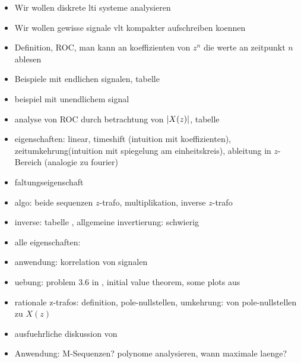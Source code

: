\begin{itemize}
    \item Wir wollen diskrete \gls{lti} systeme analysieren
    \item Wir wollen gewisse signale vlt kompakter aufschreiben koennen
    \item Definition, ROC, man kann an koeffizienten von $z^n$ die werte an zeitpunkt $n$ ablesen
    \item Beispiele mit endlichen signalen, tabelle \cite[p155, top]{proakis2013}
    \item beispiel mit unendlichem signal
    \item analyse von ROC durch betrachtung von ${\left| X(z) \right|}$, tabelle \cite[p155, top]{proakis2013}
    \item eigenschaften: linear, timeshift (intuition mit koeffizienten), zeitumkehrung(intuition mit spiegelung am einheitskreis), ableitung in $z$-Bereich (analogie zu fourier)
    \item faltungseigenschaft
    \item algo: beide sequenzen $z$-trafo, multiplikation, inverse $z$-trafo
    \item inverse: tabelle \cite[tabelle 3.3]{proakis2013}, allgemeine invertierung: schwierig
    \item alle eigenschaften: \cite[tabelle 3.2]{proakis2013}
    \item anwendung: korrelation von signalen
    \item uebung: problem 3.6 in \cite{proakis2013}, initial value theorem, some plots aus \cite{proakis2013}
    \item rationale z-trafos: definition, pole-nullstellen, umkehrung: von pole-nullstellen zu $X(z)$
    \item ausfuehrliche diskussion von \cite[fig 3.3.5, 3.3.6]{proakis2013} 
    \item Anwendung: M-Sequenzen? polynome analysieren, wann maximale laenge?
\end{itemize}

